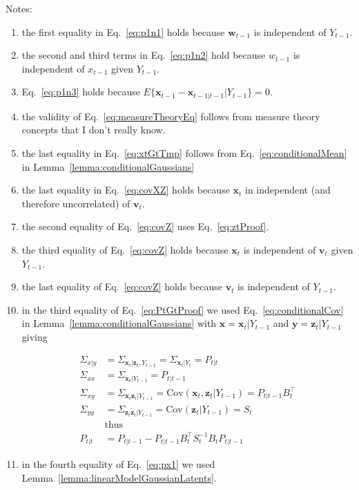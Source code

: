 \documentclass[12pt]{article}
\begin{document}
Notes:
\begin{enumerate}
    \item the first equality in Eq.~\ref{eq:p1n1} holds because
        $\mathbf{w}_{t-1}$ is independent of $Y_{t-1}$.
    \item the second and third terms in Eq.~\ref{eq:p1n2} hold because
        $w_{t-1}$ is independent of $x_{t-1}$ given $Y_{t-1}$.
    \item Eq.~\ref{eq:p1n3} holds because
        $E\{\mathbf{x}_{t-1}-\mathbf{x}_{t-1|t-1}|Y_{t-1}\}=0$.
    \item the validity of Eq.~\ref{eq:measureTheoryEq} follows from measure
        theory concepts that I don't really know.
    \item the last equality in Eq.~\ref{eq:xtGtTmp} follows from Eq.~\ref{eq:conditionalMean} in
        Lemma~\ref{lemma:conditionalGaussians}
    \item the last equality in Eq.~\ref{eq:covXZ} holds because $\mathbf{x}_t$
        in independent (and therefore uncorrelated) of $\mathbf{v}_t$.
    \item the second equality of Eq.~\ref{eq:covZ} uses Eq.~\ref{eq:ztProof}.
    \item the third equality of Eq.~\ref{eq:covZ} holds because $\mathbf{x}_t$
        is independent of $\mathbf{v}_t$ given $Y_{t-1}$.
    \item the last equality of Eq.~\ref{eq:covZ} holds because $\mathbf{v}_t$
        is independent of $Y_{t-1}$.
	\item in the third equality of Eq.~\ref{eq:PtGtProof} we used Eq.~\ref{eq:conditionalCov} in Lemma~\ref{lemma:conditionalGaussians}
	with $\mathbf{x}=\mathbf{x}_t|Y_{t-1}$ and $\mathbf{y}=\mathbf{z}_t|Y_{t-1}$ giving

		\begin{align*}
			\Sigma_{x|y}&=\Sigma_{\mathbf{x}_t|\mathbf{z}_t,Y_{t-1}}=\Sigma_{\mathbf{x}_t|Y_t}=P_{t|t}\\
			\Sigma_{xx}&=\Sigma_{\mathbf{x}_t|Y_{t-1}}=P_{t|t-1}\\
			\Sigma_{xy}&=\Sigma_{\mathbf{x}_t\mathbf{z}_t|Y_{t-1}}=\text{Cov}(\mathbf{x}_t,\mathbf{z}_t|Y_{t-1})=P_{t|t-1}B_t^\intercal\\
			\Sigma_{yy}&=\Sigma_{\mathbf{z}_t\mathbf{z}_t|Y_{t-1}}=\text{Cov}(\mathbf{z}_t|Y_{t-1})=S_t\\
                        &\text{thus}\\
            P_{t|t}&=P_{t|t-1}-P_{t|t-1}B_t^\intercal S_t^{-1}B_tP_{t|t-1}
		\end{align*}
	\item in the fourth equality of Eq.~\ref{eq:px1} we used Lemma~\ref{lemma:linearModelGaussianLatents}.

\end{enumerate}

\pagebreak



\pagebreak





\end{document}
